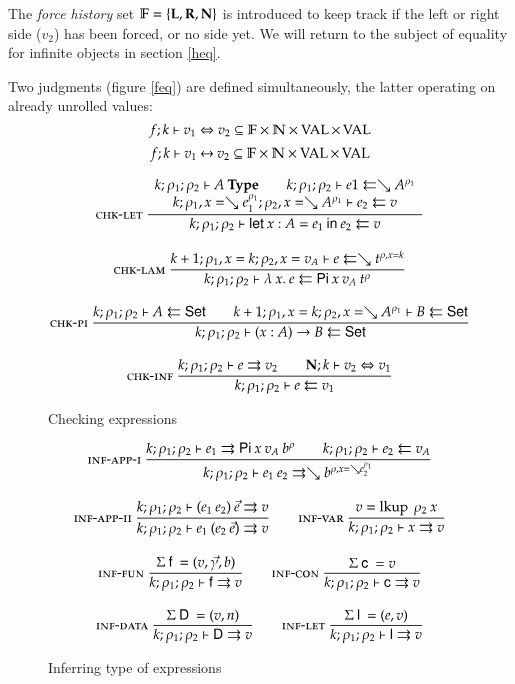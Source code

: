The \emph{force history} set $ \mathbb{F} = \{\mathbf{L}, \mathbf{R}, \mathbf{N} \} $ is introduced to keep track if the left or right side ($v_2$) has been forced, or no side yet.
We will return to the subject of equality for infinite objects in section \ref{heq}.

Two judgments (figure \ref{feq}) are defined simultaneously, the latter operating on already unrolled values:
\[f;k\vdash v_1\Leftrightarrow v_2 \subseteq \mathbb{F} \times \mathbb{N} \times \operatorname{VAL} \times \operatorname{VAL} \]
\[f;k\vdash v_1{\:\leftrightarrow\:}v_2 \subseteq \mathbb{F} \times \mathbb{N} \times\operatorname{VAL} \times \operatorname{VAL} \]

\begin{figure}[htp]

\begin{gather*}
\mbox{\sc chk-let}\ \dfrac{\begin{array}[b]{c}
k;\rho_1;\rho_2\vdash A\:\mathbf{Type}
\qquad
k;\rho_1;\rho_2\vdash e1\leftleftarrows\searrow A^{\rho_1}
\\
k;\rho_1,x=\searrow e_1^{\rho_1};\rho_2,x=\searrow A^{\rho_1}\vdash e_2\leftleftarrows v
\end{array}}{k;\rho_1;\rho_2\vdash\mathsf{let}\: x : A = e_1 \: \mathsf{in}\:{e_2}\leftleftarrows v}
\\[2ex]
\mbox{\sc chk-lam}\ \dfrac{k+1;\rho_1,x=k;\rho_2,x=v_A\vdash e\leftleftarrows\searrow t^{\rho,x=k}}{k;\rho_1;\rho_2\vdash\lambda\: x .\:{e}\leftleftarrows\mathsf{Pi} \: x \: v_A \: t^{\rho}}
\\[2ex]
\mbox{\sc chk-pi}\ \dfrac{k;\rho_1;\rho_2\vdash A\leftleftarrows\mathsf{Set}
\qquad
k+1;\rho_1,x=k;\rho_2,x=\searrow A^{\rho_1}\vdash B\leftleftarrows\mathsf{Set}
}{k;\rho_1;\rho_2\vdash( x : A ) \rightarrow{B}\leftleftarrows\mathsf{Set}}
\\[2ex]
\mbox{\sc chk-inf}\ \dfrac{k;\rho_1;\rho_2\vdash e\rightrightarrows v_2
\qquad
{\mathbf{N};k\vdash v_2\Leftrightarrow v_1}}{k;\rho_1;\rho_2\vdash e\leftleftarrows v_1}
\end{gather*}
\caption{Checking expressions}
\label{fcheck}
\end{figure}

\begin{figure}[htp]
\begin{gather*}
\mbox{\sc inf-app-i}\ \dfrac{k;\rho_1;\rho_2\vdash e_1\rightrightarrows\mathsf{Pi} \: x \: v_A \: b^{\rho}
\qquad k;\rho_1;\rho_2\vdash e_2\leftleftarrows v_A}{k;\rho_1;\rho_2\vdash e_1 \: e_2\rightrightarrows\searrow b^{\rho,x=\searrow e_2^{\rho_1}}}
\\[2ex]
\mbox{\sc inf-app-ii}\ \dfrac{k;\rho_1;\rho_2\vdash(e_1 \: e_2)\:\vec{e}\rightrightarrows v}{k;\rho_1;\rho_2\vdash e_1 \: (e_2 \: \vec{e})\rightrightarrows v}
\qquad
\mbox{\sc inf-var}\ \dfrac{v = \operatorname{lkup} \: \rho_2 \: x }{k;\rho_1;\rho_2\vdash x\rightrightarrows v}
\\[2ex]
\mbox{\sc inf-fun}\ \dfrac{\Sigma \: \mathsf{f} \: = (v,\vec{\gamma},b) }{k;\rho_1;\rho_2\vdash\mathsf{f}\rightrightarrows v}
\qquad
\mbox{\sc inf-con}\ \dfrac{\Sigma \: \mathsf{c} \: = v}{k;\rho_1;\rho_2\vdash\mathsf{c}\rightrightarrows v}
\\[2ex] 
\mbox{\sc inf-data}\ \dfrac{\Sigma \: \mathsf{D} \: = (v,n)}{k;\rho_1;\rho_2\vdash\mathsf{D}\rightrightarrows v} 
\qquad
\mbox{\sc inf-let}\ \dfrac{\Sigma \: \mathsf{l} \: = (e,v)}{k;\rho_1;\rho_2\vdash\mathsf{l}\rightrightarrows v}
\end{gather*}
\caption{Inferring type of expressions}
\label{finf}
\end{figure}

